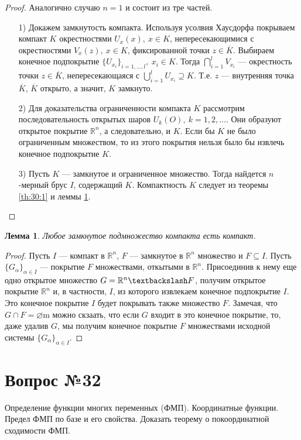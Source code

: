 \documentclass[12pt]{report}
\numberwithin{equation}{section}
\newtheorem{lemma}{Лемма}[section]
\begin{document}
\begin{proof}
Аналогично случаю $n = 1$ и состоит из тре частей.
\begin{enumerate}

\item[1)] Докажем замкнутость компакта. Используя усолвия Хаусдорфа покрываем компакт $K$ окрестностями $U_x(x),~x \in K$, непересекающимися с окрестностями $V_x(z),~x \in K$, фиксированной точки $z \in \overline{K}$. Выбираем конечное подпокрытие $\{ U_{x_i}\}_{i = 1, \ldots, l},~x_i \in K$. Тогда $\bigcap\limits_{i = 1}^l V_{x_i}$ --- окрестность точки $z \in \overline{K}$, непересекающаяся с $\bigcup\limits_{i  = 1}^l U_{x_i} \supseteq K$. Т.е. $z$ --- внутренняя точка $\overline{K}$, $\overline{K}$ открыто, а значит, $K$ замкнуто.
\item[2)] Для доказательства ограниченности компакта $K$ рассмотрим последовательность открытых шаров $U_k(O),~k=1,2,\ldots$. Они образуют открытое покрытие $\mathbb{R}^n$, а следовательно, и $K$. Если бы $K$ не было ограниченным множеством, то из этого покрытия нельзя было бы извлечь конечное подпокрытие $K$.
\item[3)] Пусть $K$ --- замкнутое и ограниченное множество. Тогда найдется $n$-мерный брус $I$, содержащий $K$. Компактность $K$ следует из теоремы \ref{th:30:1} и леммы \ref{lemm:31:1}.
\end{enumerate}
\end{proof}

\begin{lemma} \label{lemm:31:1}
Любое замкнутое подмножество компакта есть компакт.
\end{lemma}
\begin{proof}
Пусть $I$ --- компакт в $\mathbb{R}^n$, $F$ --- замкнутое в $\mathbb{R}^n$ множество и $F \subseteq I$. Пусть $\{ G_{\alpha} \}_{\alpha \in I}$ --- покрытие $F$ множествами, откытыми в $\mathbb{R}^n$. Присоединив к нему еще одно открытое множество $G = \mathbb{R}^n \textbackslash F$, получим открытое покрытие $\mathbb{R}^n$ и, в частности, $I$, из которого извлекаем конечное подпокрытие $I$. Это конечное покрытие $I$ будет покрывать также множество $F$. Замечая, что $G \cap F = \varnothing$m можно скзаать, что если $G$ входит в это конечное покрытие, то, даже удалив $G$, мы получим конечное покрытие $F$ множествами исходной системы $\{ G_{\alpha}\}_{\alpha \in I}$.
\end{proof}

\newpage \section{Вопрос №32} %
\begin{framed}
Определение функции многих переменных (ФМП). Координатные функции. Предел ФМП по базе и его свойства. Доказать теорему о покоординатной сходимости ФМП.
\end{framed}
\end{document}
